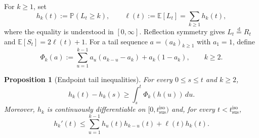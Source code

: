 \documentclass[11pt,a4paper]{amsart}
\newtheorem{proposition}[theorem]{Proposition}
\theoremstyle{remark}
\begin{document}
For $k\geq1$, set
\[
h_k(t):=\mathbb{P}(L_t\geq k),
\qquad
\ell(t):=\mathbb{E}[L_t]=\sum_{k\geq1}h_k(t),
\]
where the equality is understood in $[0,\infty]$. Reflection symmetry gives
$L_t\stackrel{\mathrm d}=R_t$ and
$\mathbb{E}[S_t]=2\ell(t)+1$. For a tail sequence $a=(a_k)_{k\geq1}$ with
$a_1=1$, define
\[
\Phi_k(a)
:=
\sum_{u=1}^{k-1}a_u(a_{k-u}-a_k)+a_k(1-a_k),
\qquad k\geq2.
\]
\begin{proposition}[Endpoint tail inequalities]
\label{prop:isotropic-endpoint-tail}
For every $0\leq s\leq t$ and $k\geq2$,
\begin{equation}
\label{eq:isotropic-endpoint-supersolution}
h_k(t)-h_k(s)
\geq
\int_s^t\Phi_k(h(u))\,du.
\end{equation}
Moreover, $h_k$ is continuously differentiable on
$[0,t_{\mathrm{sus}}^{\mathrm{iso}})$ and, for every
$t<t_{\mathrm{sus}}^{\mathrm{iso}}$,
\begin{equation}
\label{eq:isotropic-endpoint-upper}
h_k'(t)
\leq
\sum_{u=1}^{k-1}h_u(t)h_{k-u}(t)
+\ell(t)h_k(t).
\end{equation}
\end{proposition}
\end{document}
